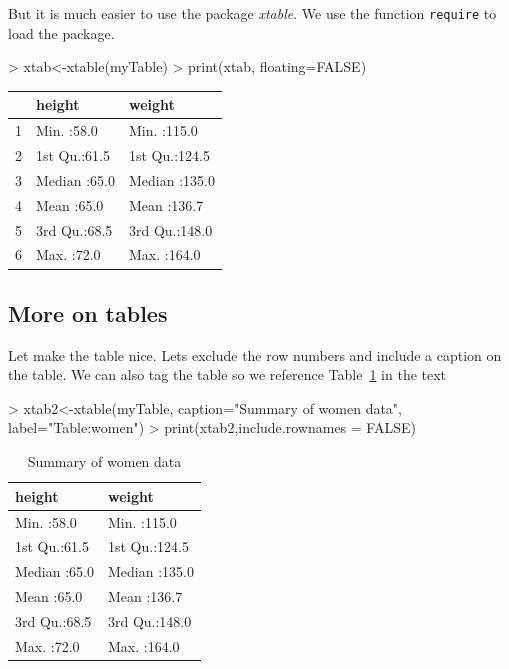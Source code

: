 \documentclass{article}
\newcommand{\Rfunction}[1]{{\texttt{#1}}}
\newcommand{\Rpackage}[1]{\textit{#1}}
\begin{document}
But it is much easier to use the package \Rpackage{xtable}. We use the function \Rfunction{require} to load the package.

\begin{Schunk}
\begin{Sinput}
> xtab<-xtable(myTable)
> print(xtab, floating=FALSE)
\end{Sinput}
\begin{tabular}{rll}
  \hline
 &     height &     weight \\ 
  \hline
1 & Min.   :58.0   & Min.   :115.0   \\ 
  2 & 1st Qu.:61.5   & 1st Qu.:124.5   \\ 
  3 & Median :65.0   & Median :135.0   \\ 
  4 & Mean   :65.0   & Mean   :136.7   \\ 
  5 & 3rd Qu.:68.5   & 3rd Qu.:148.0   \\ 
  6 & Max.   :72.0   & Max.   :164.0   \\ 
   \hline
\end{tabular}\end{Schunk}


\subsection{More on tables}

Let make the table nice.  Lets exclude the row numbers and include a caption on the table. We can also tag the table so we reference Table~\ref{Table:women} in the text


\begin{Schunk}
\begin{Sinput}
> xtab2<-xtable(myTable, caption="Summary of women data",  label="Table:women")
> print(xtab2,include.rownames = FALSE)
\end{Sinput}
\begin{table}[ht]
\centering
\begin{tabular}{ll}
  \hline
    height &     weight \\ 
  \hline
Min.   :58.0   & Min.   :115.0   \\ 
  1st Qu.:61.5   & 1st Qu.:124.5   \\ 
  Median :65.0   & Median :135.0   \\ 
  Mean   :65.0   & Mean   :136.7   \\ 
  3rd Qu.:68.5   & 3rd Qu.:148.0   \\ 
  Max.   :72.0   & Max.   :164.0   \\ 
   \hline
\end{tabular}
\caption{Summary of women data} 
\label{Table:women}
\end{table}\end{Schunk}
\end{document}
